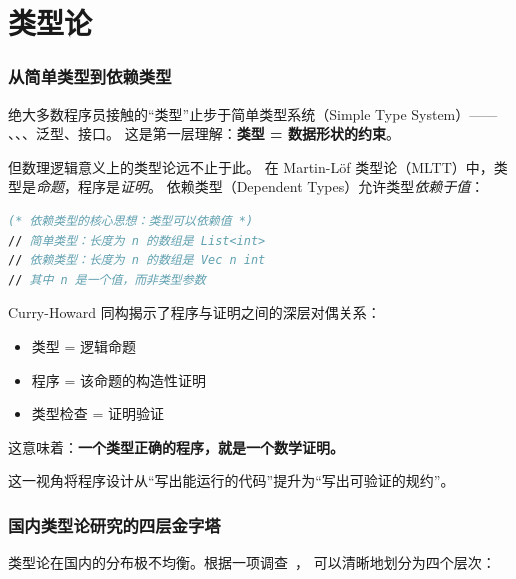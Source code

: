 \documentclass[10pt, openany]{book}
\begin{document}
\chapter{类型论}

\subsection{从简单类型到依赖类型}

绝大多数程序员接触的“类型”止步于简单类型系统（Simple Type System）——
、、、泛型、接口。
这是第一层理解：\textbf{类型 = 数据形状的约束}。

但数理逻辑意义上的类型论远不止于此。
在 Martin-L\"of 类型论（MLTT）中，类型是\emph{命题}，程序是\emph{证明}。
依赖类型（Dependent Types）允许类型\emph{依赖于值}：

\begin{lstlisting}[language=FSharp]
(* 依赖类型的核心思想：类型可以依赖值 *)
// 简单类型：长度为 n 的数组是 List<int>
// 依赖类型：长度为 n 的数组是 Vec n int
// 其中 n 是一个值，而非类型参数
\end{lstlisting}

\begin{definition}
Curry-Howard 同构揭示了程序与证明之间的深层对偶关系：
\begin{itemize}
    \item 类型 = 逻辑命题
    \item 程序 = 该命题的构造性证明
    \item 类型检查 = 证明验证
\end{itemize}
这意味着：\textbf{一个类型正确的程序，就是一个数学证明。}
\end{definition}

这一视角将程序设计从“写出能运行的代码”提升为“写出可验证的规约”。

\subsection{国内类型论研究的四层金字塔}

类型论在国内的分布极不均衡。根据一项调查~\cite{JackZhu2026TypeTheory}，
可以清晰地划分为四个层次：
\end{document}
